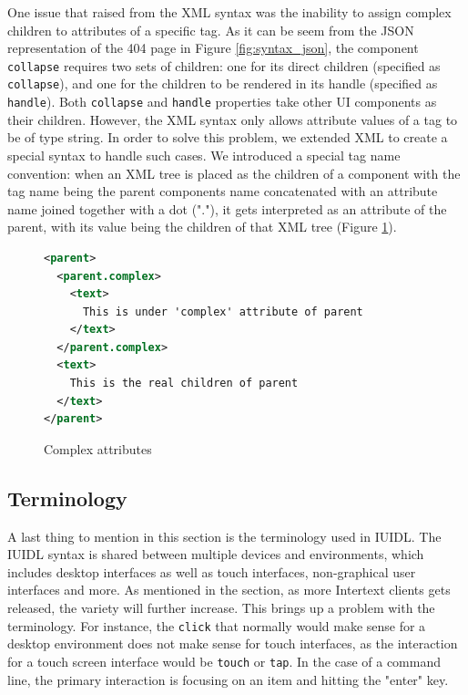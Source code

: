 One issue that raised from the XML syntax was the inability to assign complex children to attributes of a specific tag. As it can be seem from the JSON representation of the 404 page in Figure \ref{fig:syntax_json}, the component \texttt{collapse} requires two sets of children: one for its direct children (specified as \texttt{collapse}), and one for the children to be rendered in its handle (specified as \texttt{handle}). Both \texttt{collapse} and \texttt{handle} properties take other UI components as their children. However, the XML syntax only allows attribute values of a tag to be of type string. In order to solve this problem, we extended XML to create a special syntax to handle such cases. We introduced a special tag name convention: when an XML tree is placed as the children of a component with the tag name being the parent components name concatenated with an attribute name joined together with a dot ("."), it gets interpreted as an attribute of the parent, with its value being the children of that XML tree (Figure \ref{fig:complex_attributes}).

\begin{figure}
\begin{minipage}{\linewidth}
\begin{lstlisting}[language=xml]
<parent>
  <parent.complex>
    <text>
      This is under 'complex' attribute of parent
    </text>
  </parent.complex>
  <text>
    This is the real children of parent
  </text>
</parent>
\end{lstlisting}
\end{minipage}
\caption{Complex attributes}%
\label{fig:complex_attributes}%
\end{figure}


\subsection{Terminology}

A last thing to mention in this section is the terminology used in IUIDL. The IUIDL syntax is shared between multiple devices and environments, which includes desktop interfaces as well as touch interfaces, non-graphical user interfaces and more. As mentioned in the  section, as more Intertext clients gets released, the variety will further increase. This brings up a problem with the terminology. For instance, the \texttt{click} that normally would make sense for a desktop environment does not make sense for touch interfaces, as the interaction for a touch screen interface would be \texttt{touch} or \texttt{tap}. In the case of a command line, the primary interaction is focusing on an item and hitting the "enter" key. 

